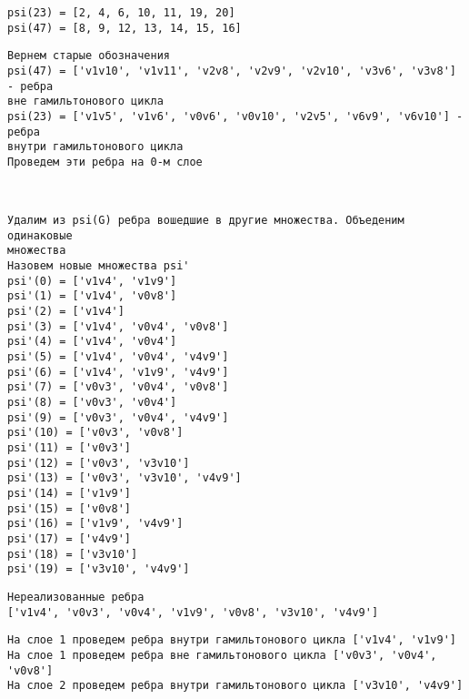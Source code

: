 \documentclass[11pt]{article}
\begin{document}
    \begin{Verbatim}[commandchars=\\\{\}]
psi(23) = [2, 4, 6, 10, 11, 19, 20]
psi(47) = [8, 9, 12, 13, 14, 15, 16]
    \end{Verbatim}

    \begin{Verbatim}[commandchars=\\\{\}]
Вернем старые обозначения
psi(47) = ['v1v10', 'v1v11', 'v2v8', 'v2v9', 'v2v10', 'v3v6', 'v3v8'] - ребра
вне гамильтонового цикла
psi(23) = ['v1v5', 'v1v6', 'v0v6', 'v0v10', 'v2v5', 'v6v9', 'v6v10'] - ребра
внутри гамильтонового цикла
Проведем эти ребра на 0-м слое
    \end{Verbatim}

    \begin{center}
    \end{center}
    { \hspace*{\fill} \\}
    
    \begin{Verbatim}[commandchars=\\\{\}]
Удалим из psi(G) ребра вошедшие в другие множества. Объеденим одинаковые
множества
Назовем новые множества psi'
psi'(0) = ['v1v4', 'v1v9']
psi'(1) = ['v1v4', 'v0v8']
psi'(2) = ['v1v4']
psi'(3) = ['v1v4', 'v0v4', 'v0v8']
psi'(4) = ['v1v4', 'v0v4']
psi'(5) = ['v1v4', 'v0v4', 'v4v9']
psi'(6) = ['v1v4', 'v1v9', 'v4v9']
psi'(7) = ['v0v3', 'v0v4', 'v0v8']
psi'(8) = ['v0v3', 'v0v4']
psi'(9) = ['v0v3', 'v0v4', 'v4v9']
psi'(10) = ['v0v3', 'v0v8']
psi'(11) = ['v0v3']
psi'(12) = ['v0v3', 'v3v10']
psi'(13) = ['v0v3', 'v3v10', 'v4v9']
psi'(14) = ['v1v9']
psi'(15) = ['v0v8']
psi'(16) = ['v1v9', 'v4v9']
psi'(17) = ['v4v9']
psi'(18) = ['v3v10']
psi'(19) = ['v3v10', 'v4v9']
    \end{Verbatim}

    \begin{Verbatim}[commandchars=\\\{\}]
Нереализованные ребра
['v1v4', 'v0v3', 'v0v4', 'v1v9', 'v0v8', 'v3v10', 'v4v9']
    \end{Verbatim}

    \begin{Verbatim}[commandchars=\\\{\}]
На слое 1 проведем ребра внутри гамильтонового цикла ['v1v4', 'v1v9']
На слое 1 проведем ребра вне гамильтонового цикла ['v0v3', 'v0v4', 'v0v8']
На слое 2 проведем ребра внутри гамильтонового цикла ['v3v10', 'v4v9']
    \end{Verbatim}
\end{document}
